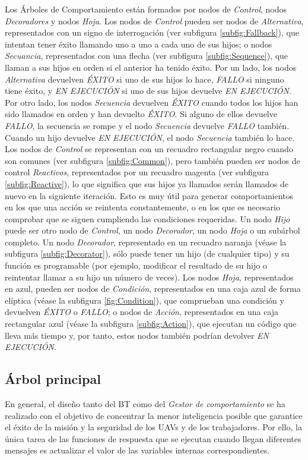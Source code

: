\documentclass[fontsize=11pt, English=false, Español=true, Myfinal=true, twoside, numbers=noenddot]{scrbook}
\begin{document}
Los Árboles de Comportamiento están formados por nodos de \emph{Control}, nodos \emph{Decoradores} y nodos \emph{Hoja}. Los nodos de \emph{Control} pueden ser nodos de \emph{Alternativa}, representados con un signo de interrogación (ver subfigura \ref{subfig:Fallback}), que intentan tener éxito llamando uno a uno a cada uno de sus hijos; o nodos \emph{Secuancia}, representados con una flecha (ver subfigura \ref{subfig:Sequence}), que llaman a sus hijos en orden si el anterior ha tenido éxito. Por un lado, los nodos \emph{Alternativa} devuelven \emph{ÉXITO} si uno de sus hijos lo hace, \emph{FALLO} si ninguno tiene éxito, y \emph{EN EJECUCIÓN} si uno de sus hijos devuelve \emph{EN EJECUCIÓN}. Por otro lado, los nodos \emph{Secuencia} devuelven \emph{ÉXITO} cuando todos los hijos han sido llamados en orden y han devuelto \emph{ÉXITO}. Si alguno de ellos devuelve \emph{FALLO}, la secuencia se rompe y el nodo \emph{Secuencia} devuelve \emph{FALLO} también. Cuando un hijo devuelve \emph{EN EJECUCIÓN}, el nodo \emph{Secuencia} también lo hace. Los nodos de \emph{Control} se representan con un recuadro rectangular negro cuando son comunes (ver subfigura \ref{subfig:Common}), pero también pueden ser nodos de control \emph{Reactivos}, representados por un recuadro magenta (ver subfigura \ref{subfig:Reactive}), lo que significa que sus hijos ya llamados serán llamados de nuevo en la siguiente iteración. Esto es muy útil para generar comportamientos en los que una acción se reintenta constantemente, o en los que es necesario comprobar que se siguen cumpliendo las condiciones requeridas. Un nodo \emph{Hijo} puede ser otro nodo de \emph{Control}, un nodo \emph{Decorador}, un nodo \emph{Hoja} o un subárbol completo. Un nodo \emph{Decorador}, representado en un recuadro naranja (véase la subfigura \ref{subfig:Decorator}), sólo puede tener un hijo (de cualquier tipo) y su función es programable (por ejemplo, modificar el resultado de su hijo o reintentar llamar a su hijo un número de veces). Los nodos \emph{Hoja}, representados en azul, pueden ser nodos de \emph{Condición}, representados en una caja azul de forma elíptica (véase la subfigura \ref{fig:Condition}), que comprueban una condición y devuelven \emph{ÉXITO} o \emph{FALLO}; o nodos de \emph{Acción}, representados en una caja rectangular azul (véase la subfigura \ref{subfig:Action}), que ejecutan un código que lleva más tiempo y, por tanto, estos nodos también podrían devolver \emph{EN EJECUCIÓN}.

\subsection{Árbol principal}
\label{sec:MainTree}
En general, el diseño tanto del \gls{BT} como del \emph{Gestor de comportamiento} se ha realizado con el objetivo de concentrar la menor inteligencia posible que garantice el éxito de la misión y la seguridad de los \glspl{UAV} y de los trabajadores. Por ello, la única tarea de las funciones de respuesta que se ejecutan cuando llegan diferentes mensajes es actualizar el valor de las variables internas correspondientes. 
\end{document}
